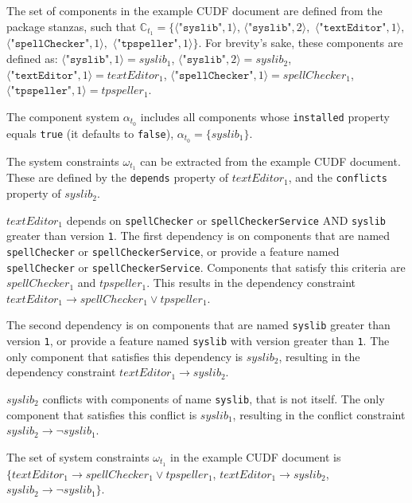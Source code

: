 The set of components in the example CUDF document are defined from the package stanzas,
such that $\mathbb{C}_{t_1} = \{\langle \texttt{"syslib"},1 \rangle$, 
$\langle \texttt{"syslib"},2\rangle,$ 
$\langle \texttt{"textEditor"},1 \rangle,$ 
$\langle \texttt{"spellChecker"},1 \rangle,$ 
$\langle \texttt{"tpspeller"},1 \rangle\}$. 
For brevity's sake, these components are defined as:
$\langle \texttt{"syslib"},1 \rangle = syslib_1$, $\langle \texttt{"syslib"},2\rangle = syslib_2 $,  $\langle \texttt{"textEditor"},1 \rangle =  textEditor_1 $,  
$\langle \texttt{"spellChecker"},1 \rangle =  spellChecker_1 $,  $\langle \texttt{"tpspeller"},1 \rangle =  tpspeller_1 $.

The component system $\alpha_{t_{0}}$ includes all components whose \verb+installed+ property equals \verb+true+ (it defaults to \texttt{false}),
$\alpha_{t_{0}} = \{ syslib_1 \}$.

The system constraints $\omega_{t_1}$ can be extracted from the example CUDF document.
These are defined by the \texttt{depends} property of $textEditor_1$, and the \texttt{conflicts} property of $syslib_2$.

$textEditor_1$ depends on \texttt{spellChecker} or \texttt{spellCheckerService} AND \texttt{syslib} greater than version \texttt{1}.
The first dependency is on components that are named  \texttt{spellChecker} or \texttt{spellCheckerService},
or provide a feature named \texttt{spellChecker} or \texttt{spellCheckerService}.
Components that satisfy this criteria are $ spellChecker_1$ and $tpspeller_1$.
This results in the dependency constraint $textEditor_1 \rightarrow spellChecker_1 \vee tpspeller_1$.

The second dependency is on components that are named  \texttt{syslib}  greater than version \texttt{1},
or provide a feature named \texttt{syslib} with version greater than \texttt{1}.
The only component that satisfies this dependency is $syslib_2$,
resulting in the dependency constraint $textEditor_1 \rightarrow syslib_2$.

$syslib_2$ conflicts with components of name \texttt{syslib}, that is not itself.
The only component that satisfies this conflict is $syslib_1$,
resulting in the conflict constraint $syslib_2 \rightarrow \neg syslib_1$.

The set of system constraints $\omega_{t_1}$ in the example CUDF document is
$\{ textEditor_1 \rightarrow spellChecker_1 \vee tpspeller_1$,
$textEditor_1 \rightarrow syslib_2$, 
$syslib_2 \rightarrow \neg syslib_1\}$.


